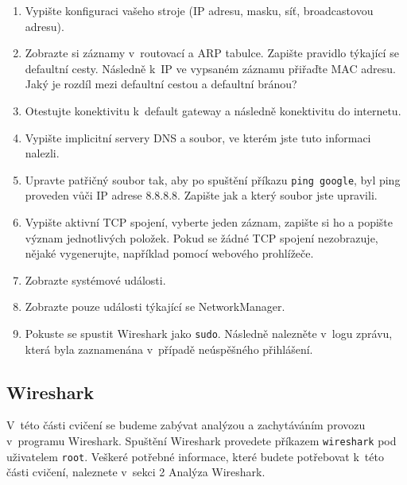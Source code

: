 \begin{enumerate}
\item Vypište konfiguraci vašeho stroje (IP adresu, masku, síť, broadcastovou adresu).
\item Zobrazte si záznamy v~routovací a ARP tabulce. Zapište pravidlo týkající se defaultní cesty. Následně k~IP ve vypsaném záznamu přiřaďte MAC adresu. Jaký je rozdíl mezi defaultní cestou a defaultní bránou?
\item Otestujte konektivitu k~default gateway a následně konektivitu do internetu.
\item Vypište implicitní servery DNS a soubor, ve kterém jste tuto informaci nalezli.
\item Upravte patřičný soubor tak, aby po spuštění příkazu \texttt{ping google}, byl ping proveden vůči IP adrese 8.8.8.8. Zapište jak a který soubor jste upravili.
\item Vypište aktivní TCP spojení, vyberte jeden záznam, zapište si ho a popište význam jednotlivých položek. Pokud se žádné TCP spojení nezobrazuje, nějaké vygenerujte, například pomocí webového prohlížeče.
\item Zobrazte systémové události.
\item Zobrazte pouze události týkající se NetworkManager.
\item Pokuste se spustit Wireshark jako \texttt{sudo}. Následně nalezněte v~logu zprávu, která byla zaznamenána v~případě neúspěšného přihlášení.
\end{enumerate}

\subsection{Wireshark}
V~této části cvičení se budeme zabývat analýzou a zachytáváním provozu v~programu Wireshark. Spuštění Wireshark provedete příkazem \texttt{wireshark} pod uživatelem \texttt{root}. Veškeré potřebné informace, které budete potřebovat k~této části cvičení, naleznete v~sekci 2 Analýza Wireshark.

